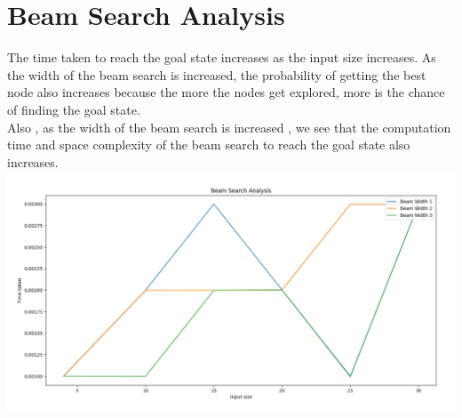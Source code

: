 \documentclass{article}
\begin{document}
\section{Beam Search Analysis}
The time taken to reach the goal state increases as the input size increases.
As the width of the beam search is increased, the probability of getting the best node also increases because the more the
nodes get explored, more is the chance of finding the goal state.
\\Also , as the width of the beam search is increased , we see that the computation time and space complexity of the beam search to reach the goal state also increases.
\\\includegraphics[scale=0.3]{BeamSearch.jpg}
\newpage
\end{document}
